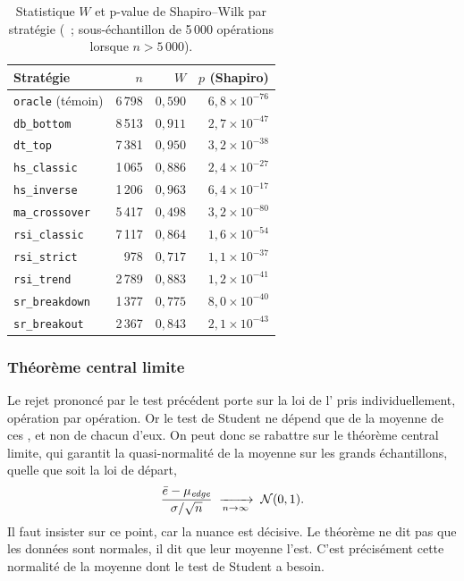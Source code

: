 \begin{table}[H]
\centering
\caption{Statistique \(W\) et p-value de Shapiro--Wilk par stratégie
(\edgevar{}~; sous-échantillon de 5\,000 opérations lorsque \(n > 5\,000\)).}
\label{tab:shapiro}
\small
\begin{tabular}{@{}lrrr@{}}
\toprule
Stratégie & $n$ & $W$ & $p$ (Shapiro) \\
\midrule
\texttt{oracle} (témoin) & 6\,798 & $0{,}590$ & $6{,}8\times10^{-76}$ \\
\midrule
\texttt{db\_bottom}    & 8\,513 & $0{,}911$ & $2{,}7\times10^{-47}$ \\
\texttt{dt\_top}       & 7\,381 & $0{,}950$ & $3{,}2\times10^{-38}$ \\
\texttt{hs\_classic}   & 1\,065 & $0{,}886$ & $2{,}4\times10^{-27}$ \\
\texttt{hs\_inverse}   & 1\,206 & $0{,}963$ & $6{,}4\times10^{-17}$ \\
\texttt{ma\_crossover} & 5\,417 & $0{,}498$ & $3{,}2\times10^{-80}$ \\
\texttt{rsi\_classic}  & 7\,117 & $0{,}864$ & $1{,}6\times10^{-54}$ \\
\texttt{rsi\_strict}   &   978  & $0{,}717$ & $1{,}1\times10^{-37}$ \\
\texttt{rsi\_trend}    & 2\,789 & $0{,}883$ & $1{,}2\times10^{-41}$ \\
\texttt{sr\_breakdown} & 1\,377 & $0{,}775$ & $8{,}0\times10^{-40}$ \\
\texttt{sr\_breakout}  & 2\,367 & $0{,}843$ & $2{,}1\times10^{-43}$ \\
\bottomrule
\end{tabular}
\end{table}

\subsubsection*{Théorème central limite}

Le rejet prononcé par le test précédent porte sur la loi de l'\edgevar{} pris
individuellement, opération par opération. Or le test de Student ne dépend
que de la moyenne de ces \edgevar{}, et non de chacun d'eux. On peut donc se
rabattre sur le théorème central limite, qui garantit la quasi-normalité de
la moyenne sur les grands échantillons, quelle que soit la loi de départ,
\[
  \frac{\bar e - \mu_{\textit{edge}}}{\sigma/\sqrt{n}}
  \;\xrightarrow[n \to \infty]{}\; \mathcal{N}(0,1) .
\]
Il faut insister sur ce point, car la nuance est décisive. Le théorème ne dit
pas que les données sont normales, il dit que leur moyenne l'est. C'est
précisément cette normalité de la moyenne dont le test de Student a besoin.


